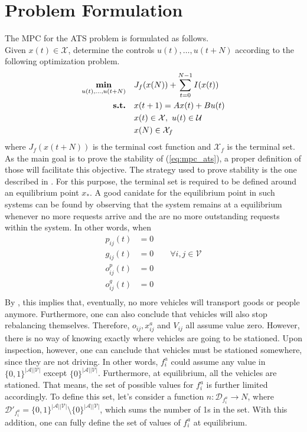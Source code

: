 \section{Problem Formulation}\label{sec:prob_formulat_mpc}
The MPC for the ATS problem is formulated as follows. \\
Given $x(t) \in \mathcal{X}$, determine the controls $u(t), \dots, u(t+N)$ according to the following optimization problem.
\begin{equation}
	\begin{aligned}
		\underset{\substack{u(t), \dots, u(t+N)}}{\text{\textbf{min}}} \quad & J_f(x(N))+\sum_{t=0}^{N-1}I(x(t)) \\
		\text{\textbf{s.t.}} \quad & x(t+1) = Ax(t) + Bu(t)  \\
		& x(t) \in \mathcal{X}, \ u(t)\in \mathcal{U} \\
		&x(N) \in \mathcal{X}_f\\
	\end{aligned}
	\label{eq:mpc_ats}
\end{equation}
where $J_f(x(t+N))$ is the terminal cost function and $\mathcal{X}_f$ is the terminal set. \\
As the main goal is to prove the stability of (\ref{eq:mpc_ats}), a proper definition of those will facilitate this objective. The strategy used to prove stability is the one described in . For this purpose, the terminal set is required to be defined around an equilibrium point $x_*$. A good canidate for the equilibrium point in such systems can be found by observing that the system remains at a equilibrium whenever no more requests arrive and the are no more outstanding requests within the system. In other words, when 
\begin{align*}
	p_{ij}(t) &=0 \\
	g_{ij}(t) &=0\quad\quad \forall i,j\in\mathcal{V}\\
	o^p_{ij}(t) &=0\\
	o^g_{ij}(t) &=0\\
\end{align*}
By , this implies that, eventually, no more vehicles will transport goods or people anymore. Furthermore, one can also conclude that vehicles will also stop rebalancing themselves. Therefore, $o_{ij}, x_{ij}^a$ and $V_{ij}$ all assume value zero. However, there is no way of knowing exactly where vehicles are going to be stationed. Upon inspection, however, one can canclude that vehicles must be stationed somewhere, since they are not driving. In other words, $f^a_{i}$ could assume any value in $\{0,1\}^{|\mathcal{A}||\mathcal{V}|} $ except $ \{0\}^{|\mathcal{A}||\mathcal{V}|}$. Furthermore, at equilibrium, all the vehicles are stationed. That means, the set of possible values for  $f^a_{i}$ is further limited accordingly. To define this set, let's consider a function $n : \mathcal{D}_{f^a_{i}} \rightarrow N$, where $\mathcal{D}'_{f^a_{i}}  = \{0,1\}^{|\mathcal{A}||\mathcal{V}|} \setminus \{0\}^{|\mathcal{A}||\mathcal{V}|}$, which sums the number of 1s in the set. With this addition, one can fully define the set of values of $f^a_{i}$  at equilibrium. 

